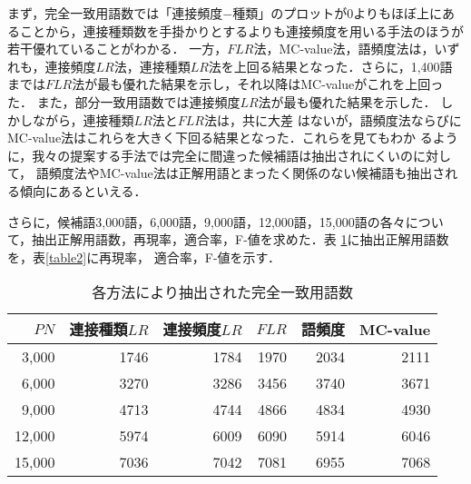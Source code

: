 まず，完全一致用語数では「連接頻度$-$種類」のプロットが0よりもほぼ上にあることから，連接種類数を手掛かりとするよりも連接頻度を用いる手法のほうが若干優れていることがわかる．
一方，$FLR$法，MC-value法，語頻度法は，いずれも，連接頻度$LR$法，連接種類$LR$法を上回る結果となった．さらに，1,400語
までは$FLR$法が最も優れた結果を示し，それ以降はMC-valueがこれを上回った．
また，部分一致用語数では連接頻度$LR$法が最も優れた結果を示した．
しかしながら，連接種類$LR$法と$FLR$法は，共に大差
はないが，語頻度法ならびにMC-value法はこれらを大きく下回る結果となった．これらを見てもわか
るように，我々の提案する手法では完全に間違った候補語は抽出されにくいのに対して，
語頻度法やMC-value法は正解用語とまったく関係のない候補語も抽出される傾向にあるといえる．

さらに，候補語3,000語，6,000語，9,000語，12,000語，15,000語の各々につい
て，抽出正解用語数，再現率，適合率，F-値を求めた．表
\ref{table1}に抽出正解用語数を，表\ref{table2}に再現率，
適合率，F-値を示す．
\begin{table}[htbp]
\caption{各方法により抽出された完全一致用語数}\label{table1}
\begin{center}
\begin{tabular}{|r|r|r|r|r|r|}
\hline
$PN$   &  連接種類$LR$     & 連接頻度$LR$    & $FLR$  & 語頻度 & MC-value \\ \hline
3,000  & 1746          & 1784        & 1970   & 2034     & 2111 \\ \hline
6,000  & 3270          & 3286        & 3456   & 3740     & 3671 \\ \hline
9,000  & 4713          & 4744        & 4866   & 4834     & 4930 \\ \hline
12,000 & 5974          & 6009        & 6090   & 5914     & 6046 \\ \hline
15,000 & 7036          & 7042        & 7081   & 6955     & 7068 \\ \hline
\end{tabular}
\end{center}
\end{table}
